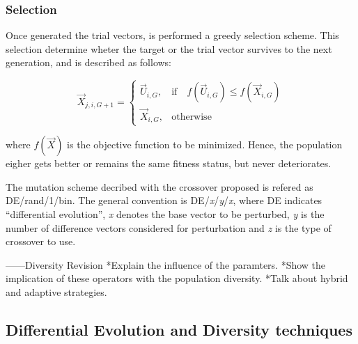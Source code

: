 \subsubsection{Selection}
Once generated the trial vectors, is performed a greedy selection scheme.
%
This selection determine wheter the target or the trial vector survives to the next generation, and is described as follows:

\begin{equation} \label{eqn:selection}
\vec{X}_{j,i,G+1}= 
\begin{cases}
    \vec{U}_{i,G},& \text{if} \quad f(\vec{U}_{i,G}) \leq f(\vec{X}_{i,G})  \\
    \vec{X}_{i,G},              & \text{otherwise}
\end{cases}
\end{equation}

where $f(\vec{X})$ is the objective function to be minimized.
%
Hence, the population eigher gets better or remains the same fitness status, but never deteriorates.

The mutation scheme decribed with the crossover proposed is refered as DE/rand/1/bin.
%
The general convention is DE/\textit{x}/\textit{y}/\textit{x}, where DE indicates ``differential evolution'', \textit{x} denotes the base vector to be perturbed, \textit{y} is the number of difference vectors considered for perturbation and \textit{z} is the type of crossover to use.

------Diversity Revision
*Explain the influence of the paramters.
*Show the implication of these operators with the population diversity.
*Talk about hybrid and adaptive strategies.



\subsection{Differential Evolution and Diversity techniques}

